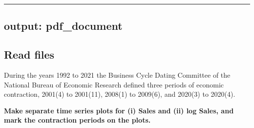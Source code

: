\documentclass[
]{article}
\author{}
\date{\vspace{-2.5em}}
\begin{document}
\begin{center}\rule{0.5\linewidth}{0.5pt}\end{center}

\subsection{output: pdf\_document}\label{output-pdf_document}

\subsection{Read files}\label{read-files}

During the years 1992 to 2021 the Business Cycle Dating Committee of the
National Bureau of Economic Research defined three periods of economic
contraction, 2001(4) to 2001(11), 2008(1) to 2009(6), and 2020(3) to
2020(4).

\textbf{Make separate time series plots for (i) Sales and (ii) log
Sales, and mark the contraction periods on the plots.}
\end{document}
